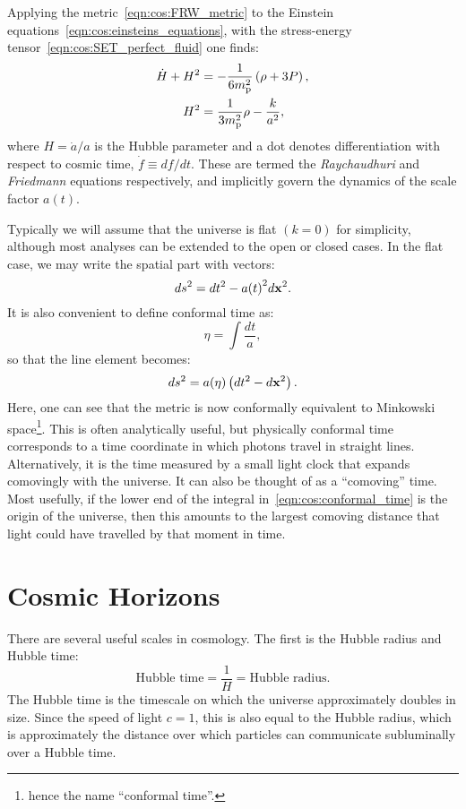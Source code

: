 Applying the metric~\eqref{eqn:cos:FRW_metric} to the Einstein equations~\eqref{eqn:cos:einsteins_equations}, with the stress-energy tensor~\eqref{eqn:cos:SET_perfect_fluid} one finds:
\begin{align}
  \dot{H}+H^2 &= 
  -\frac{1}{6m_{\mathrm{p}}^2}\left( \rho + 3P\right), 
  \label{eqn:Raychaudhuri_rho}
  \\
  H^2 &= 
  \frac{1}{3m_{\mathrm{p}}^2}\rho - \frac{k}{a^2}, 
\end{align}
%
where $H=\dot{a}/a$ is the Hubble parameter and a dot denotes differentiation with respect to cosmic time, $\dot{f}\equiv df/dt$. These are termed the {\em Raychaudhuri\/} and {\em Friedmann\/} equations respectively, and implicitly govern the dynamics of the scale factor $a(t)$. 


 Typically we will assume that the universe is flat $(k=0)$ for simplicity, although most analyses can be extended to the open or closed cases. In the flat case, we may write the spatial part with vectors:
\begin{equation}
  ds^2 = dt^2 - a{(t)}^2 d{\mathbf{x}}^2.
  \label{eqn:cos:flat_FRW}
\end{equation}
It is also convenient to define conformal time as:
\begin{equation}
  \eta = \int \frac{dt}{a},
  \label{eqn:cos:conformal_time}
\end{equation}
so that the line element becomes:
\begin{equation}
  ds^2 = a(\eta)\left( dt^2 - d{\mathbf{x}}^2 \right).
  \label{eqn:cos:flat_FRW}
\end{equation}
Here, one can see that the metric is now conformally equivalent to Minkowski space\footnote{hence the name ``conformal time''.}.
This is often analytically useful, but physically conformal time corresponds to a time coordinate in which photons travel in straight lines. Alternatively, it is the time measured by a small light clock that expands comovingly with the universe. It can also be thought of as a ``comoving'' time. Most usefully, if the lower end of the integral in~\eqref{eqn:cos:conformal_time} is the origin of the universe, then this amounts to the largest comoving distance that light could have travelled by that moment in time.
                                                                     
\section{Cosmic Horizons}
There are several useful scales in cosmology. The first is the Hubble radius and Hubble time:
\begin{equation}
  \text{Hubble time} = \frac{1}{H} = \text{Hubble radius}.
  \label{eqn:cos:Hubble_def}
\end{equation}
The Hubble time is the timescale on which the universe approximately doubles in size. Since the speed of light $c=1$, this is also equal to the Hubble radius, which is approximately the distance over which particles can communicate subluminally over a Hubble time.

